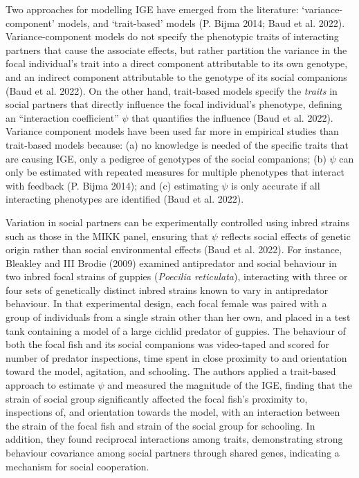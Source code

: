\documentclass[
]{book}
\begin{document}
Two approaches for modelling IGE have emerged from the literature: `variance-component' models, and `trait-based' models (P. Bijma 2014; Baud et al. 2022). Variance-component models do not specify the phenotypic traits of interacting partners that cause the associate effects, but rather partition the variance in the focal individual's trait into a direct component attributable to its own genotype, and an indirect component attributable to the genotype of its social companions (Baud et al. 2022). On the other hand, trait-based models specify the \emph{traits} in social partners that directly influence the focal individual's phenotype, defining an ``interaction coefficient'' \(\psi\) that quantifies the influence (Baud et al. 2022). Variance component models have been used far more in empirical studies than trait-based models because: (a) no knowledge is needed of the specific traits that are causing IGE, only a pedigree of genotypes of the social companions; (b) \(\psi\) can only be estimated with repeated measures for multiple phenotypes that interact with feedback (P. Bijma 2014); and (c) estimating \(\psi\) is only accurate if all interacting phenotypes are identified (Baud et al. 2022).

Variation in social partners can be experimentally controlled using inbred strains such as those in the MIKK panel, ensuring that \(\psi\) reflects social effects of genetic origin rather than social environmental effects (Baud et al. 2022). For instance, Bleakley and III Brodie (2009) examined antipredator and social behaviour in two inbred focal strains of guppies (\emph{Poecilia reticulata}), interacting with three or four sets of genetically distinct inbred strains known to vary in antipredator behaviour. In that experimental design, each focal female was paired with a group of individuals from a single strain other than her own, and placed in a test tank containing a model of a large cichlid predator of guppies. The behaviour of both the focal fish and its social companions was video-taped and scored for number of predator inspections, time spent in close proximity to and orientation toward the model, agitation, and schooling. The authors applied a trait-based approach to estimate \(\psi\) and measured the magnitude of the IGE, finding that the strain of social group significantly affected the focal fish's proximity to, inspections of, and orientation towards the model, with an interaction between the strain of the focal fish and strain of the social group for schooling. In addition, they found reciprocal interactions among traits, demonstrating strong behaviour covariance among social partners through shared genes, indicating a mechanism for social cooperation.
\end{document}
